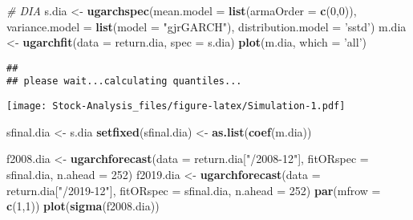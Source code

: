\documentclass[
]{article}
\newenvironment{Shaded}{\begin{snugshade}}{\end{snugshade}}
\newcommand{\CommentTok}[1]{\textcolor[rgb]{0.56,0.35,0.01}{\textit{#1}}}
\newcommand{\DataTypeTok}[1]{\textcolor[rgb]{0.13,0.29,0.53}{#1}}
\newcommand{\DecValTok}[1]{\textcolor[rgb]{0.00,0.00,0.81}{#1}}
\newcommand{\KeywordTok}[1]{\textcolor[rgb]{0.13,0.29,0.53}{\textbf{#1}}}
\newcommand{\NormalTok}[1]{#1}
\newcommand{\StringTok}[1]{\textcolor[rgb]{0.31,0.60,0.02}{#1}}
\begin{document}
\begin{Shaded}
\begin{Highlighting}[]
\CommentTok{# DIA}
\NormalTok{s.dia <-}\StringTok{ }\KeywordTok{ugarchspec}\NormalTok{(}\DataTypeTok{mean.model =} \KeywordTok{list}\NormalTok{(}\DataTypeTok{armaOrder =} \KeywordTok{c}\NormalTok{(}\DecValTok{0}\NormalTok{,}\DecValTok{0}\NormalTok{)),}
                \DataTypeTok{variance.model =} \KeywordTok{list}\NormalTok{(}\DataTypeTok{model =} \StringTok{"gjrGARCH"}\NormalTok{),}
                \DataTypeTok{distribution.model =} \StringTok{'sstd'}\NormalTok{)}
\NormalTok{m.dia <-}\StringTok{ }\KeywordTok{ugarchfit}\NormalTok{(}\DataTypeTok{data =}\NormalTok{ return.dia, }\DataTypeTok{spec =}\NormalTok{ s.dia)}
\KeywordTok{plot}\NormalTok{(m.dia, }\DataTypeTok{which =} \StringTok{'all'}\NormalTok{)}
\end{Highlighting}
\end{Shaded}

\begin{verbatim}
## 
## please wait...calculating quantiles...
\end{verbatim}

\texttt{[image: Stock-Analysis\_files/figure-latex/Simulation-1.pdf]}

\begin{Shaded}
\begin{Highlighting}[]
\NormalTok{sfinal.dia <-}\StringTok{ }\NormalTok{s.dia}
\KeywordTok{setfixed}\NormalTok{(sfinal.dia) <-}\StringTok{ }\KeywordTok{as.list}\NormalTok{(}\KeywordTok{coef}\NormalTok{(m.dia))}

\NormalTok{f2008.dia <-}\StringTok{ }\KeywordTok{ugarchforecast}\NormalTok{(}\DataTypeTok{data =}\NormalTok{ return.dia[}\StringTok{"/2008-12"}\NormalTok{],}
                        \DataTypeTok{fitORspec =}\NormalTok{ sfinal.dia,}
                        \DataTypeTok{n.ahead =} \DecValTok{252}\NormalTok{)}
\NormalTok{f2019.dia <-}\StringTok{ }\KeywordTok{ugarchforecast}\NormalTok{(}\DataTypeTok{data =}\NormalTok{ return.dia[}\StringTok{"/2019-12"}\NormalTok{],}
                        \DataTypeTok{fitORspec =}\NormalTok{ sfinal.dia,}
                        \DataTypeTok{n.ahead =} \DecValTok{252}\NormalTok{)}
\KeywordTok{par}\NormalTok{(}\DataTypeTok{mfrow =} \KeywordTok{c}\NormalTok{(}\DecValTok{1}\NormalTok{,}\DecValTok{1}\NormalTok{))}
\KeywordTok{plot}\NormalTok{(}\KeywordTok{sigma}\NormalTok{(f2008.dia))}
\end{Highlighting}
\end{Shaded}
\end{document}
